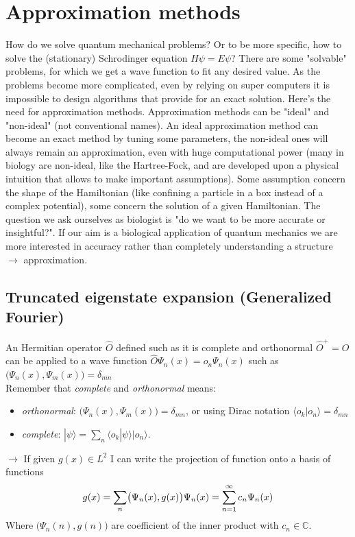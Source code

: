 \graphicspath{{chapters/05/}}
\chapter{Approximation methods}
How do we solve quantum mechanical problems? Or to be more specific, how to solve the (stationary) Schrodinger equation $ H \psi = E \psi$? There are some "solvable" problems, for which we get a wave function to fit any desired value. As the problems become more complicated, even by relying on super computers it is impossible to design algorithms that provide for an exact solution. Here's the need for approximation methods. Approximation methods can be "ideal" and "non-ideal" (not conventional names). An ideal approximation method can become an exact method by tuning some parameters, the non-ideal ones will always remain an approximation, even with huge computational power (many in biology are non-ideal, like the Hartree-Fock, and are developed upon a physical intuition that allows to make important assumptions).
Some assumption concern the shape of the Hamiltonian (like confining a particle in a box instead of a complex potential), some concern the solution of a given Hamiltonian. 
The question we ask ourselves as biologist is "do we want to be more accurate or insightful?". If our aim is a biological application of quantum mechanics we are more interested in accuracy rather than completely understanding a structure $\rightarrow$ approximation.
\section{Truncated eigenstate expansion (Generalized Fourier)}
An Hermitian operator $\hat{O}$ defined such as it is complete and orthonormal $\hat{O}^+=\hat{O}$ can be applied to a wave function $\hat{O}\Psi_n(x)=o_n\Psi_n(x)$ such as $\bigl(\Psi_n(x),\Psi_m(x)\bigr)=\delta_{mn}$\\
Remember that \textit{complete} and \textit{orthonormal} means:
\begin{itemize}
\item \textit{orthonormal}: $\bigl(\Psi_n(x),\Psi_m(x)\bigr)=\delta_{mn}$, or using Dirac notation $\langle o_k|o_n \rangle = \delta_{mn}$
\item \textit{complete}: $ | \psi \rangle = \sum_n \langle o_k | \psi \rangle |o_n \rangle$.
\end{itemize}

$\rightarrow$ If given $g(x)\in L^2$ I can write the projection of function onto a basis of functions\\
\[
g(x)=\sum_{n}\bigl(\Psi_n(x),g(x)\bigr)\Psi_n(x) =\sum_{n=1}^{\infty}c_n\Psi_n(x)\\
\]
Where $\bigl(\Psi_n(n),g(n)\bigr)$ are coefficient of the inner product with $c_n\in \mathbb{C}$. \\

